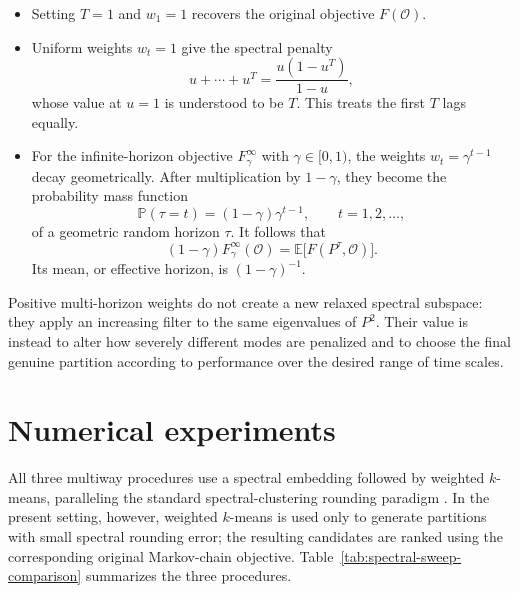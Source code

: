 \documentclass[11pt]{article}
\newcommand{\1}{\mathbf{1}}
\begin{document}
\begin{itemize}
    \item Setting $T=1$ and $w_1=1$ recovers the original objective
    $F(\mathcal O)$.

    \item Uniform weights $w_t=1$ give the spectral penalty
    \[
        u+\cdots+u^T
        =\frac{u(1-u^T)}{1-u},
    \]
    whose value at $u=1$ is understood to be $T$.  This treats the
    first $T$ lags equally.

    \item For the infinite-horizon objective $F_\gamma^\infty$ with $\gamma \in [0,1)$, the weights
    $w_t=\gamma^{t-1}$ decay geometrically.  After multiplication by
    $1-\gamma$, they become the probability mass function
    \[
    \mathbb P(\tau=t)
    =(1-\gamma)\gamma^{t-1},
    \qquad t=1,2,\ldots,
    \]
    of a geometric random horizon $\tau$. It follows that
    \begin{equation*}
    	(1-\gamma)F_\gamma^\infty(\mathcal O)
    	=\mathbb E\bigl[F(P^\tau,\mathcal O)\bigr].
    \end{equation*}
    Its mean, or effective horizon, is $(1-\gamma)^{-1}$.
\end{itemize}

Positive multi-horizon weights do not create a new relaxed spectral
subspace: they apply an increasing filter to the same eigenvalues of
$P^2$.  Their value is instead to alter how severely different modes
are penalized and to choose the final genuine partition according to
performance over the desired range of time scales.  

\section{Numerical experiments}
\label{sec:numerical-experiments}

All three multiway procedures use a spectral embedding followed by
weighted $k$-means, paralleling the standard spectral-clustering
rounding paradigm \citep{NgJordanWeiss2001}.  In the present setting,
however, weighted $k$-means is used only to generate partitions with
small spectral rounding error; the resulting candidates are ranked
using the corresponding original Markov-chain objective.
Table~\ref{tab:spectral-sweep-comparison} summarizes the three
procedures.
\end{document}
